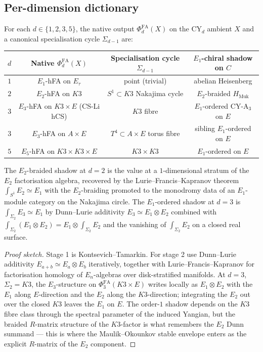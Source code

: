 \subsection{Per-dimension dictionary}

\begin{theorem}
\label{thm:per-d-native-shadow}
For each $d\in\{1,2,3,5\}$, the native output $\Phi^{\mathrm{FA}}_d(X)$
on the CY$_d$ ambient $X$ and a canonical specialisation cycle
$\Sigma_{d-1}$ are:
\begin{center}
\begin{tabular}{c|c|c|c}
$d$ & Native $\Phi^{\mathrm{FA}}_d(X)$ & Specialisation cycle $\Sigma_{d-1}$ &
$E_1$-chiral shadow on $C$\\
\hline
$1$ & $E_1$-hFA on $E_\tau$ & point (trivial) & abelian Heisenberg\\
$2$ & $E_2$-hFA on $K3$ & $S^1\subset K3$ Nakajima cycle & $E_2$-braided
$H_{\mathrm{Muk}}$\\
$3$ & $E_3$-hFA on $K3\times E$ (CS-Li hCS) & $K3$ fibre & $E_1$-ordered
$\mathrm{CY\text{-}A}_3$ on $E$\\
$3$ & $E_3$-hFA on $A\times E$ & $T^4\subset A\times E$ torus fibre &
sibling $E_1$-ordered on $E$\\
$5$ & $E_5$-hFA on $K3\times K3\times E$ & $K3\times K3$ & $E_1$-ordered
on $E$\\
\end{tabular}
\end{center}
The $E_2$-braided shadow at $d=2$ is the value at a $1$-dimensional
stratum of the $E_2$ factorisation algebra, recovered by the
Lurie--Francis--Kapranov theorem $\int_{S^1} E_2 \simeq E_1$ with the
$E_2$-braiding promoted to the monodromy data of an $E_1$-module
category on the Nakajima circle. The $E_1$-ordered shadow at $d=3$ is
$\int_{\Sigma_2}E_3\simeq E_1$ by Dunn--Lurie additivity
$E_3\simeq E_1\otimes E_2$ combined with
$\int_{\Sigma_2}(E_1\otimes E_2)=E_1\otimes \int_{\Sigma_2}E_2$ and the
vanishing of $\int_{\Sigma_2}E_2$ on a closed real surface.
\end{theorem}

\begin{proof}[Proof sketch]
Stage 1 is Kontsevich--Tamarkin. For stage 2 use Dunn--Lurie additivity
$E_{a+b}\simeq E_a\otimes E_b$ iteratively, together with
Lurie--Francis--Kapranov for factorisation homology of $E_n$-algebras
over disk-stratified manifolds. At $d=3$, $\Sigma_2=K3$, the
$E_3$-structure on $\Phi^{\mathrm{FA}}_3(K3\times E)$ writes locally as
$E_1\otimes E_2$ with the $E_1$ along $E$-direction and the $E_2$ along
the $K3$-direction; integrating the $E_2$ out over the closed $K3$
leaves the $E_1$ on $E$. The order-$1$ shadow depends on the $K3$
fibre class through the spectral parameter of the induced Yangian, but
the braided $R$-matrix structure of the $K3$-factor is what remembers
the $E_2$ Dunn summand --- this is where the Maulik--Okounkov stable
envelope enters as the explicit $R$-matrix of the $E_2$ component.
\end{proof}

